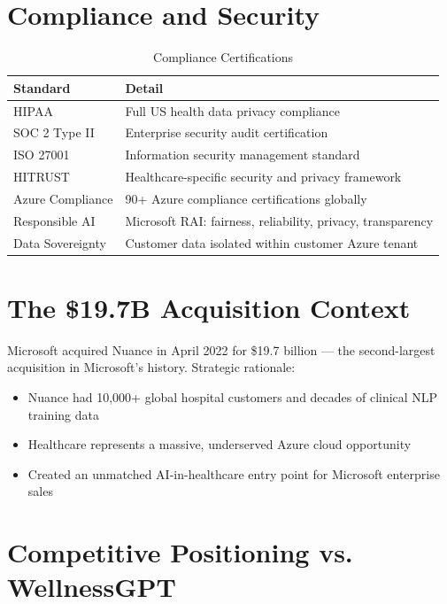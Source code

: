 \documentclass[12pt,a4paper]{article}
\begin{document}
\section{Compliance and Security}

\begin{table}[H]\centering\renewcommand{\arraystretch}{1.4}
\begin{tabularx}{\textwidth}{lX}\toprule
\textbf{Standard} & \textbf{Detail}\\\midrule
HIPAA         & Full US health data privacy compliance \\
SOC 2 Type II & Enterprise security audit certification \\
ISO 27001     & Information security management standard \\
HITRUST       & Healthcare-specific security and privacy framework \\
Azure Compliance & 90+ Azure compliance certifications globally \\
Responsible AI & Microsoft RAI: fairness, reliability, privacy, transparency \\
Data Sovereignty & Customer data isolated within customer Azure tenant \\
\bottomrule\end{tabularx}\caption{Compliance Certifications}\end{table}

\section{The \$19.7B Acquisition Context}
Microsoft acquired Nuance in April 2022 for \$19.7 billion --- the second-largest acquisition in Microsoft's history. Strategic rationale:
\begin{itemize}[noitemsep]
    \item Nuance had 10,000+ global hospital customers and decades of clinical NLP training data
    \item Healthcare represents a massive, underserved Azure cloud opportunity
    \item Created an unmatched AI-in-healthcare entry point for Microsoft enterprise sales
\end{itemize}

\section{Competitive Positioning vs. WellnessGPT}
\end{document}
